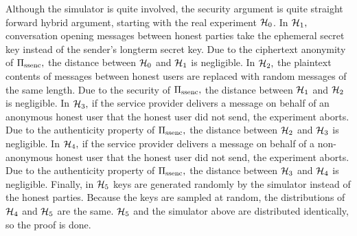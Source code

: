 

Although the simulator is quite involved, the security argument is quite straight forward hybrid argument, starting with the real experiment $\mathcal{H}_{0}$.  In $\mathcal{H}_{1},$ conversation opening messages between honest parties take the ephemeral secret key instead of the sender's longterm secret key.  Due to the ciphertext anonymity of $\Pi_{\text{ssenc}},$ the distance between $\mathcal{H}_{0}$ and $\mathcal{H}_{1}$ is negligible.  In $\mathcal{H}_{2},$ the plaintext contents of messages between honest users are replaced with random messages of the same length.  Due to the security of $\Pi_{\text{ssenc}},$ the distance between $\mathcal{H}_{1}$ and $\mathcal{H}_{2}$ is negligible.  In $\mathcal{H}_{3},$ if the service provider delivers a message on behalf of an anonymous honest user that the honest user did not send, the experiment aborts.  Due to the authenticity property of $\Pi_{\text{ssenc}},$ the distance between $\mathcal{H}_{2}$ and $\mathcal{H}_{3}$ is negligible.  In $\mathcal{H}_{4},$ if the service provider delivers a message on behalf of a non-anonymous honest user that the honest user did not send, the experiment aborts.  Due to the authenticity property of $\Pi_{\text{ssenc}},$ the distance between $\mathcal{H}_{3}$ and $\mathcal{H}_{4}$ is negligible.  Finally, in $\mathcal{H}_{5}$ keys are generated randomly by the simulator instead of the honest parties.  Because the keys are sampled at random, the distributions of $\mathcal{H}_{4}$ and $\mathcal{H}_{5}$ are the same.  $\mathcal{H}_{5}$ and the simulator above are distributed identically, so the proof is done.
